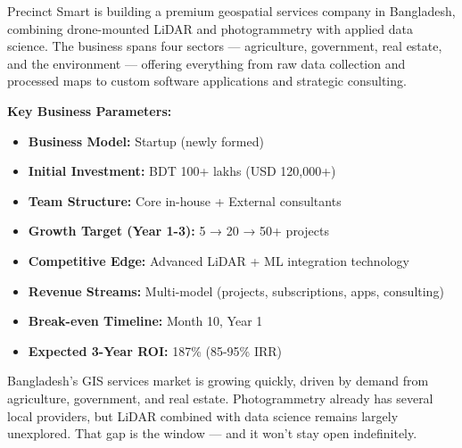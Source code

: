 Precinct Smart is building a premium geospatial services company in Bangladesh, combining drone-mounted LiDAR and photogrammetry with applied data science. The business spans four sectors --- agriculture, government, real estate, and the environment --- offering everything from raw data collection and processed maps to custom software applications and strategic consulting.

\vspace{1cm}

\textcolor{SecondaryBlue}{\textbf{Key Business Parameters:}}

\begin{itemize}[noitemsep]
    \item \textbf{Business Model:} Startup (newly formed)
    \item \textbf{Initial Investment:} BDT 100+ lakhs (USD 120,000+)
    \item \textbf{Team Structure:} Core in-house + External consultants
    \item \textbf{Growth Target (Year 1-3):} 5 → 20 → 50+ projects
    \item \textbf{Competitive Edge:} Advanced LiDAR + ML integration technology
    \item \textbf{Revenue Streams:} Multi-model (projects, subscriptions, apps, consulting)
    \item \textbf{Break-even Timeline:} Month 10, Year 1
    \item \textbf{Expected 3-Year ROI:} 187\% (85-95\% IRR)
\end{itemize}

\vspace{1cm}

\begin{importantbox}
    Bangladesh's GIS services market is growing quickly, driven by demand from agriculture, government, and real estate. Photogrammetry already has several local providers, but LiDAR combined with data science remains largely unexplored. That gap is the window --- and it won't stay open indefinitely.
\end{importantbox}

\newpage


\tableofcontents

\newpage


